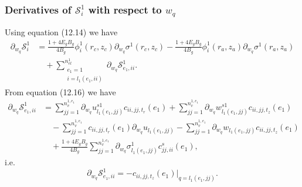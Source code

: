 \documentclass{article}
\begin{document}
\subsubsection{Derivatives of $\mathcal{S}_i^1$ with respect to $w_q$} %
Using equation (12.14) we have
\begin{align}
\partial_{w_q} \mathcal{S}_i^1 &= \frac{1 + 4 E_g B_g}{4 B_g} \phi_i^1(r_c,z_c) \partial_{w_q} \sigma^1(r_c,z_c) - \frac{1 + 4 E_g B_g}{4 B_g} \phi_i^1(r_a,z_a) \partial_{w_q} \sigma^1(r_a,z_a) \nonumber\\
&\quad + \sum_{\substack{e_1=1\\ i=l_1(e_1,ii)}}^{n_{el}^1} \partial_{w_q} \mathcal{S}_{e_1,ii}^1. \tag{12.22}
\end{align}
From equation (12.16) we have
\begin{align}
\partial_{w_q} \mathcal{S}_{e_1,ii}^1 &= \sum_{jj=1}^{n_v^{1,e_1}} \partial_{w_q} u_{l_1(e_1,jj)}^{s1} c_{ii,jj,t_r}(e_1) + \sum_{jj=1}^{n_v^{1,e_1}} \partial_{w_q} w_{l_1(e_1,jj)}^{s1} c_{ii,jj,t_z}(e_1) \nonumber\\
&\quad - \sum_{jj=1}^{n_v^{1,e_1}} c_{ii,jj,t_r}(e_1) \partial_{w_q} u_{l_1(e_1,jj)} - \sum_{jj=1}^{n_v^{1,e_1}} \partial_{w_q} w_{l_1(e_1,jj)} c_{ii,jj,t_z}(e_1) \nonumber\\
&\quad + \frac{1 + 4 E_g B_g}{4 B_g} \sum_{jj=1}^{n_v^{1,e_1}} \partial_{w_q} \sigma_{l_1(e_1,jj)}^1 c_{jj,ii}^s(e_1), \tag{12.23}
\end{align}
i.e.
\begin{equation}
\partial_{w_q} \mathcal{S}_{e_1,ii}^1 = - c_{ii,jj,t_z}(e_1) \big|_{q=l_1(e_1,jj)}. \tag{12.24}
\end{equation}
\end{document}
